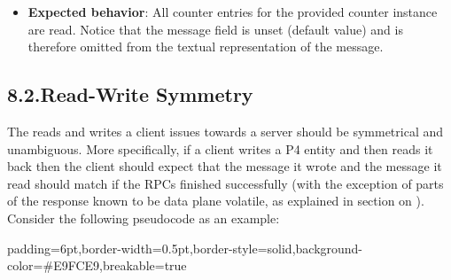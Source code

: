 \documentclass[11pt]{article}
\begin{document}
{\begin{enumerate}
\begin{itemize}[noitemsep,topsep=\mdcompacttopsep]
\item{}\textbf{Expected behavior}: All counter entries for the provided counter
instance are read. Notice that the  message field is unset (default
value) and is therefore omitted from the textual representation of the
message.%
\end{itemize}%
\end{enumerate}%

\subsection{8.2.\hspace*{0.5em}Read-Write Symmetry}\label{sec-read-write-symmetry}%

\noindent{}The reads and writes a client issues towards a server should be symmetrical and
unambiguous. More specifically, if a client writes a P4 entity and then reads it
back then the client should expect that the message it wrote and the message it
read should match if the RPCs finished successfully (with the exception of parts
of the response known to be data plane volatile, as explained in section on
).
Consider the following pseudocode as an
example:%

\begin{mdbmargintb}{6pt}{6pt}%
\begin{mdblock}{padding=6pt,border-width=0.5pt,border-style=solid,background-color=\#E9FCE9,breakable=true}%
\begin{mdpre}%
\end{mdpre}%
\end{mdblock}%
\end{mdbmargintb}%

}
\end{document}
